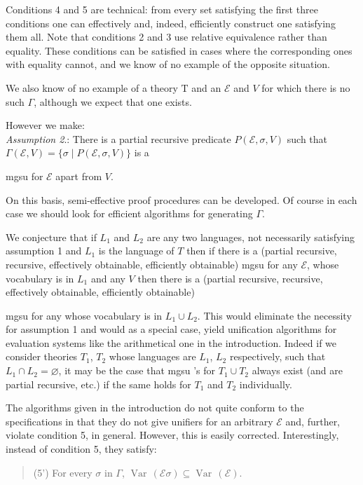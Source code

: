 \documentclass[letterpaper]{report}
\newcommand{\mgsu}{
	{\sc mgsu}%
}
\begin{document}
Conditions 4 and 5 are technical: from every set satisfying the first
three conditions one can effectively and, indeed, efficiently construct
one satisfying them all. Note that conditions 2 and 3 use relative
equivalence rather than equality. These conditions can be satisfied in
cases where the corresponding ones with equality cannot, and we know of
no example of the opposite situation.

We also know of no example of a theory $\mathrm{T}$ and an
$\mathcal{E}$ and $V$ for which there is no such $\Gamma$,
although we expect that one exists.

However we make:\\
\emph{Assumption 2}.: There is a partial recursive predicate
$P(\mathcal{E},\sigma,V)$ such that
$\Gamma(\mathcal{E},V)=\{\sigma\mid P(\mathcal{E},\sigma,V)\}$ is a
\mgsu for $\mathcal{E}$ apart from $V$.

On this basis, semi-effective proof procedures can be developed. Of
course in each case we should look for efficient algorithms for
generating $\Gamma$.

We conjecture that if $L_{1}$ and $L_{2}$ are any two languages, not
necessarily satisfying assumption 1 and $L_{1}$ is the language of
$T$ then if there is a (partial recursive, recursive, effectively
obtainable, efficiently obtainable) \mgsu{} for any $\mathcal{E}$, whose
vocabulary is in $L_{1}$ and any $V$ then there is a (partial
recursive, recursive, effectively obtainable, efficiently obtainable)
\mgsu{} for any whose vocabulary is in $L_{1}\cup L_{2}$. This would
eliminate the necessity for assumption 1 and would as a special case,
yield unification algorithms for evaluation systems like the
arithmetical one in the introduction. Indeed if we consider theories
$T_{1}$, $T_{2}$ whose languages are $L_{1}$, $L_{2}$
respectively, such that $L_{1}\cap L_{2} = \varnothing$, it may be the
case that \mgsu's for $T_{1}\cup T_{2}$ always exist
(and are partial recursive, etc.) if the same holds for $T_{1}$ and
$T_{2}$ individually.

The algorithms given in the introduction do not quite conform to the
specifications in that they do not give unifiers for an arbitrary
$\mathcal{E}$ and, further, violate condition 5, in general. However,
this is easily corrected. Interestingly, instead of condition 5, they
satisfy:
\begin{quote}
(5') For every $\sigma$ in $\Gamma$,
$\operatorname{Var}\,(\mathcal{E}\sigma)\subseteq\operatorname{Var}\,(\mathcal{E})$.
\end{quote}
\end{document}
